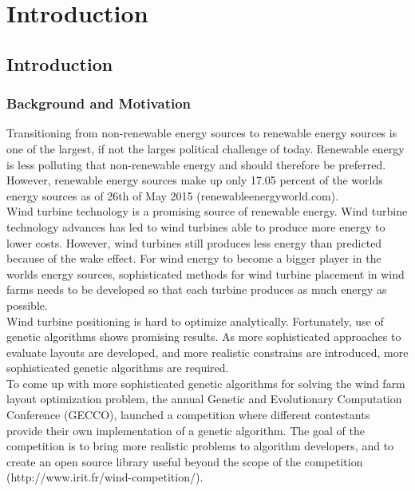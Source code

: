 \chapter{Introduction}


\section{Introduction}


\subsection{Background and Motivation}
Transitioning from non-renewable energy sources to renewable energy sources is one of the largest, if not the larges political challenge of today. Renewable energy is less polluting that non-renewable energy and should therefore be preferred. However, renewable energy sources make up only 17.05 percent of the worlds energy sources as of 26th of May 2015 (renewableenergyworld.com). \\

\noindent Wind turbine technology is a promising source of renewable energy. Wind turbine technology advances has led to wind turbines able to produce more energy to lower costs. However, wind turbines still produces less energy than predicted because of the wake effect. For wind energy to become a bigger player in the worlds energy sources, sophisticated methods for wind turbine placement in wind farms needs to be developed so that each turbine produces as much energy as possible. \\

\noindent Wind turbine positioning is hard to optimize analytically. Fortunately, use of genetic algorithms shows promising results. As more sophisticated approaches to evaluate layouts are developed, and more realistic constrains are introduced, more sophisticated genetic algorithms are required. \\

\noindent To come up with more sophisticated genetic algorithms for solving the wind farm layout optimization problem, the annual Genetic and Evolutionary Computation Conference (GECCO), launched a competition where different contestants provide their own implementation of a genetic algorithm. The goal of the competition is to bring more realistic problems to algorithm developers, and to create an open source library useful beyond the scope of the competition (http://www.irit.fr/wind-competition/). \\

